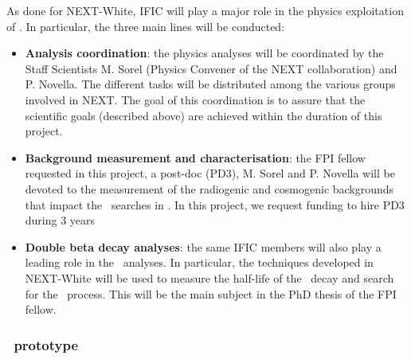 As done for NEXT-White, IFIC will play a major role in the physics exploitation of \Next. In particular, the three main lines will be conducted: 

\begin{itemize}
    \item {\bf Analysis coordination}: the physics analyses will be coordinated by the Staff Scientists M. Sorel (Physics Convener of the NEXT collaboration) and P. Novella. The different tasks will be distributed among the various groups involved in NEXT. The goal of this coordination is to assure that the scientific goals (described above) are achieved within the duration of this project. 
    \item {\bf Background measurement and characterisation}: the FPI fellow requested in this project, a post-doc (PD3), M. Sorel and P. Novella will be devoted to the measurement of the radiogenic and cosmogenic backgrounds that impact the \bb\ searches in \Next. In this project, we request funding to hire PD3 during 3 years 
    \item {\bf Double beta decay analyses}: the same IFIC members will also play a leading role in the \bb\ analyses. In particular, the techniques developed in NEXT-White will be used to measure the half-life of the \bbtnu\ decay and search for the \bbonu\ process. This will be the main subject in the PhD thesis of the FPI fellow.
\end{itemize}


\subsubsection*{\HDEMO\ prototype}

\indent

